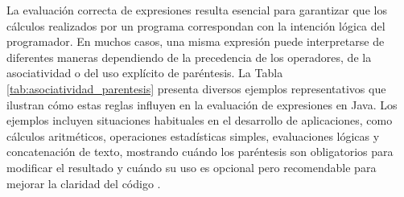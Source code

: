 \documentclass[12pt,twoside]{book}
\begin{document}
						La evaluación correcta de expresiones resulta esencial para garantizar que los cálculos realizados por un programa correspondan con la intención lógica del programador. En muchos casos, una misma expresión puede interpretarse de diferentes maneras dependiendo de la precedencia de los operadores, de la asociatividad o del uso explícito de paréntesis. La Tabla \ref{tab:asociatividad_parentesis} presenta diversos ejemplos representativos que ilustran cómo estas reglas influyen en la evaluación de expresiones en Java. Los ejemplos incluyen situaciones habituales en el desarrollo de aplicaciones, como cálculos aritméticos, operaciones estadísticas simples, evaluaciones lógicas y concatenación de texto, mostrando cuándo los paréntesis son obligatorios para modificar el resultado y cuándo su uso es opcional pero recomendable para mejorar la claridad del código \cite{Sebesta2018Concepts,Pierce2002Types,Pressman2019Software}.
						
\end{document}
